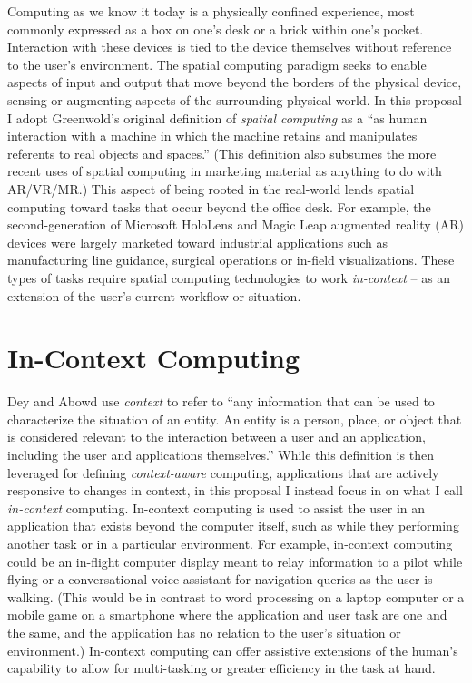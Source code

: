 \documentclass [11pt, proquest] {uwthesis}[2020/02/24]
\begin{document}
Computing as we know it today is a physically confined experience, most commonly expressed as a box on one's desk or a brick within one's pocket. Interaction with these devices is tied to the device themselves without reference to the user’s environment. The spatial computing paradigm seeks to enable aspects of input and output that move beyond the borders of the physical device, sensing or augmenting aspects of the surrounding physical world. In this proposal I adopt Greenwold’s original definition of \textit{spatial computing} as a “as human interaction with a machine in which the machine retains and manipulates referents to real objects and spaces.” (This definition also subsumes the more recent uses of spatial computing in marketing material as anything to do with AR/VR/MR.) This aspect of being rooted in the real-world lends spatial computing toward tasks that occur beyond the office desk. For example, the second-generation of Microsoft HoloLens and Magic Leap augmented reality (AR) devices were largely marketed toward industrial applications such as manufacturing line guidance, surgical operations or in-field visualizations. These types of tasks require spatial computing technologies to work \textit{in-context} – as an extension of the user’s current workflow or situation. 
 
 
\section{In-Context Computing}
 
Dey and Abowd use \textit{context} to refer to “any information that can be used to characterize the situation of an entity. An entity is a person, place, or object that is considered relevant to the interaction between a user and an application, including the user and applications themselves.” While this definition is then leveraged for defining \textit{context-aware} computing, applications that are actively responsive to changes in context, in this proposal I instead focus in on what I call \textit{in-context} computing. In-context computing is used to assist the user in an application that exists beyond the computer itself, such as while they performing another task or in a particular environment. For example, in-context computing could be an in-flight computer display meant to relay information to a pilot while flying or a conversational voice assistant for navigation queries as the user is walking. (This would be in contrast to word processing on a laptop computer or a mobile game on a smartphone where the application and user task are one and the same, and the application has no relation to the user’s situation or environment.) In-context computing can offer assistive extensions of the human’s capability to allow for multi-tasking or greater efficiency in the task at hand. 
 
\end{document}
